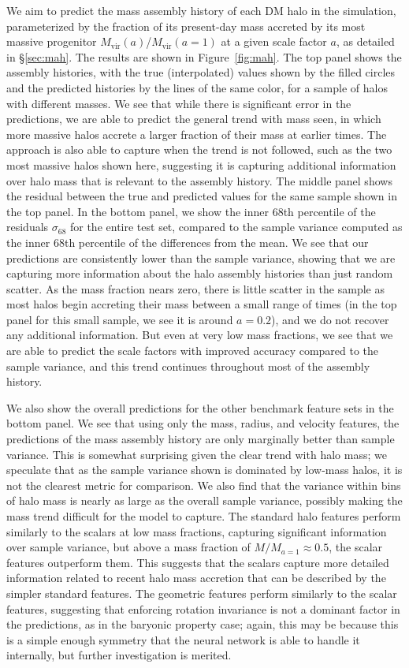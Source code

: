 We aim to predict the mass assembly history of each DM halo in the \dark simulation, parameterized by the fraction of its present-day mass accreted by its most massive progenitor $M_\mathrm{vir}(a)$/$M_\mathrm{vir}(a=1)$ at a given scale factor $a$, as detailed in \S\ref{sec:mah}.
The results are shown in Figure~\ref{fig:mah}.
The top panel shows the assembly histories, with the true (interpolated) values shown by the filled circles and the predicted histories by the lines of the same color, for a sample of halos with different masses.
We see that while there is significant error in the predictions, we are able to predict the general trend with mass seen, in which more massive halos accrete a larger fraction of their mass at earlier times.
The approach is also able to capture when the trend is not followed, such as the two most massive halos shown here, suggesting it is capturing additional information over halo mass that is relevant to the assembly history.
The middle panel shows the residual between the true and predicted values for the same sample shown in the top panel.
In the bottom panel, we show the inner 68th percentile of the residuals $\sigma_{68}$ for the entire test set, compared to the sample variance computed as the inner 68th percentile of the differences from the mean.
We see that our predictions are consistently lower than the sample variance, showing that we are capturing more information about the halo assembly histories than just random scatter.
As the mass fraction nears zero, there is little scatter in the sample as most halos begin accreting their mass between a small range of times (in the top panel for this small sample, we see it is around $a=0.2$), and we do not recover any additional information.
But even at very low mass fractions, we see that we are able to predict the scale factors with improved accuracy compared to the sample variance, and this trend continues throughout most of the assembly history.

We also show the overall predictions for the other benchmark feature sets in the bottom panel.
We see that using only the mass, radius, and velocity features, the predictions of the mass assembly history are only marginally better than sample variance.
This is somewhat surprising given the clear trend with halo mass; we speculate that as the sample variance shown is dominated by low-mass halos, it is not the clearest metric for comparison.
We also find that the variance within bins of halo mass is nearly as large as the overall sample variance, possibly making the mass trend difficult for the model to capture.
The standard halo features perform similarly to the scalars at low mass fractions, capturing significant information over sample variance, but above a mass fraction of $M/M_{a=1} \approx 0.5$, the scalar features outperform them.
This suggests that the scalars capture more detailed information related to recent halo mass accretion that can be described by the simpler standard features.
The geometric features perform similarly to the scalar features, suggesting that enforcing rotation invariance is not a dominant factor in the predictions, as in the baryonic property case; again, this may be because this is a simple enough symmetry that the neural network is able to handle it internally, but further investigation is merited.

